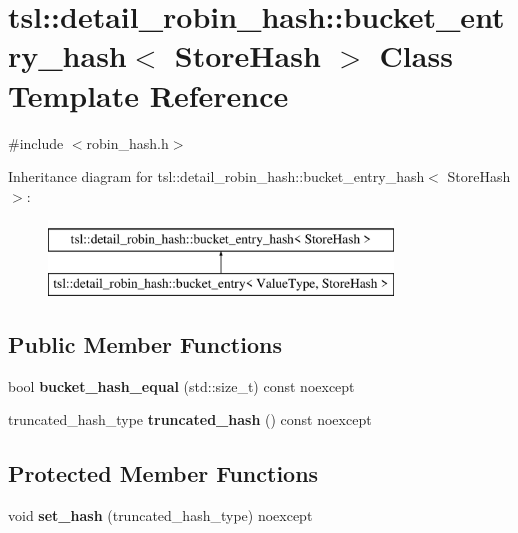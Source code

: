 \hypertarget{classtsl_1_1detail__robin__hash_1_1bucket__entry__hash}{}\section{tsl\+::detail\+\_\+robin\+\_\+hash\+::bucket\+\_\+entry\+\_\+hash$<$ Store\+Hash $>$ Class Template Reference}
\label{classtsl_1_1detail__robin__hash_1_1bucket__entry__hash}


{\ttfamily \#include $<$robin\+\_\+hash.\+h$>$}

Inheritance diagram for tsl\+::detail\+\_\+robin\+\_\+hash\+::bucket\+\_\+entry\+\_\+hash$<$ Store\+Hash $>$\+:\begin{figure}[H]
\begin{center}
\leavevmode
\includegraphics[height=2.000000cm]{classtsl_1_1detail__robin__hash_1_1bucket__entry__hash}
\end{center}
\end{figure}
\subsection*{Public Member Functions}
\begin{DoxyCompactItemize}
\item 
\mbox{\label{classtsl_1_1detail__robin__hash_1_1bucket__entry__hash_a79c39ff26357841c7136d17520f6b538}} 
bool {\bfseries bucket\+\_\+hash\+\_\+equal} (std\+::size\+\_\+t) const noexcept
\item 
\mbox{\label{classtsl_1_1detail__robin__hash_1_1bucket__entry__hash_a50e40aa4ccc2670244b23024d7717bb7}} 
truncated\+\_\+hash\+\_\+type {\bfseries truncated\+\_\+hash} () const noexcept
\end{DoxyCompactItemize}
\subsection*{Protected Member Functions}
\begin{DoxyCompactItemize}
\item 
\mbox{\label{classtsl_1_1detail__robin__hash_1_1bucket__entry__hash_af40159825764d023f139cebfbd753970}} 
void {\bfseries set\+\_\+hash} (truncated\+\_\+hash\+\_\+type) noexcept
\end{DoxyCompactItemize}


